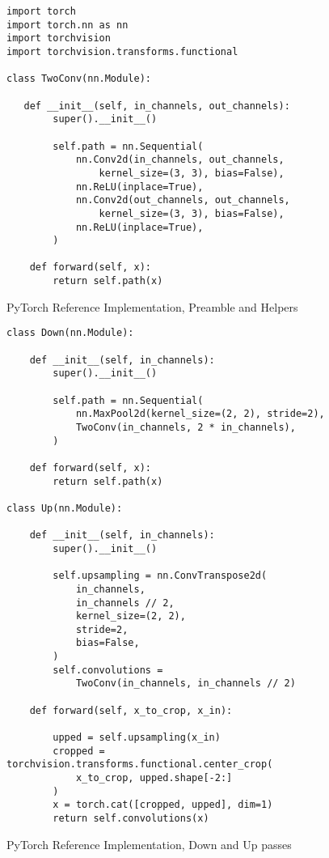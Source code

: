 \documentclass[10pt,twocolumn,english,format=sigplan,screen,balance]{acmart}
\begin{document}
\begin{figure*}
\begin{verbatim}
import torch
import torch.nn as nn
import torchvision
import torchvision.transforms.functional

class TwoConv(nn.Module):

   def __init__(self, in_channels, out_channels):
        super().__init__()

        self.path = nn.Sequential(
            nn.Conv2d(in_channels, out_channels, 
                kernel_size=(3, 3), bias=False),
            nn.ReLU(inplace=True),
            nn.Conv2d(out_channels, out_channels, 
                kernel_size=(3, 3), bias=False),
            nn.ReLU(inplace=True),
        )

    def forward(self, x):
        return self.path(x)
\end{verbatim}
\caption{PyTorch Reference Implementation, Preamble and Helpers}

\end{figure*}
\begin{figure*}
\begin{verbatim}
class Down(nn.Module):

    def __init__(self, in_channels):
        super().__init__()

        self.path = nn.Sequential(
            nn.MaxPool2d(kernel_size=(2, 2), stride=2),
            TwoConv(in_channels, 2 * in_channels),
        )

    def forward(self, x):
        return self.path(x)

class Up(nn.Module):

    def __init__(self, in_channels):
        super().__init__()

        self.upsampling = nn.ConvTranspose2d(
            in_channels,
            in_channels // 2,
            kernel_size=(2, 2),
            stride=2,
            bias=False,
        )
        self.convolutions = 
            TwoConv(in_channels, in_channels // 2)

    def forward(self, x_to_crop, x_in):

        upped = self.upsampling(x_in)
        cropped = torchvision.transforms.functional.center_crop(
            x_to_crop, upped.shape[-2:]
        )
        x = torch.cat([cropped, upped], dim=1)
        return self.convolutions(x)
\end{verbatim}
\caption{PyTorch Reference Implementation, Down and Up passes}
\end{figure*}
\end{document}
